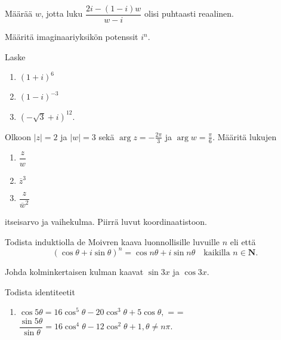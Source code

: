 \documentclass[a4paper, 12pt]{article}
\makeatletter
\theoremstyle{remark}
\theoremstyle{definition}
\renewcommand{\bar}[1]{\overline{#1}}
\newcommand{\abs}[1]{\lvert#1\rvert}
\newcommand{\inlineitem}[1][]{%
\ifnum\enit@type=\tw@
    {\descriptionlabel{#1}}
  \hspace{\labelsep}%
\else
  \ifnum\enit@type=\z@
       \refstepcounter{\@listctr}\fi
    \quad\@itemlabel\hspace{\labelsep}%
\fi}
\newenvironment{listaa} %
    {\begin{enumerate}[leftmargin=*, label=\alph*), topsep=0pt, itemsep=0pt, parsep=0pt, font=\small\bfseries\color{red}] \itemsep0pt \parskip0pt \parsep0pt \topsep0pt}
    {\end{enumerate}}
\makeatother
\begin{document}
\begin{teht}
Määrää $w$, jotta luku $\dfrac{2i-(1-i)w}{w-i}$ olisi puhtaasti reaalinen.
\end{teht}
\begin{teht} Määritä imaginaariyksikön potenssit $i^n.$
\end{teht}

\begin{teht} Laske
\begin{enumerate}[leftmargin=*, label=\roman*), topsep=0pt, itemsep=0pt, parsep=0pt, font=\small\bfseries\color{blue}]
\item $(1+i)^6$

\item $(1-i)^{-3}$

\item $(-\sqrt{3}+i)^{12}.$
\end{enumerate}

\end{teht}
\begin{teht} Olkoon $\abs{z}=2$ ja $\abs{w}=3$ sekä $\arg z=-\frac{2\pi}{3}$ ja $\arg w=\frac{\pi}{6}.$ Määritä lukujen
\begin{listaa}
\item $\dfrac{z}{w}$
\item $\bar{z}^3$
\item $\dfrac{z}{\bar{w}^2}$
\end{listaa} itseisarvo ja vaihekulma. Piirrä luvut koordinaatistoon.
\end{teht}

\begin{teht} Todista induktiolla de Moivren kaava luonnollisille luvuille $n$ eli että
$$
\left(\cos \theta+i\sin\theta\right)^n=\cos n\theta + i \sin n\theta\quad\text{kaikilla } n\in\mathbf{N}.
$$
\end{teht}

\begin{teht} Johda kolminkertaisen kulman kaavat $\sin 3x$ ja $\cos 3x.$
\end{teht}

\begin{teht} Todista identiteetit
\begin{enumerate}[label=\alph*), topsep=0pt, itemsep=0pt, parsep=0pt, leftmargin=*]
    \item $\cos 5\theta =16\cos^5 \theta -20\cos^3\theta +5\cos\theta,$
    \inlineitem $\dfrac{\sin 5\theta}{\sin\theta}=16\cos^4\theta -12\cos^2\theta+1, \theta\neq n\pi.$
\end{enumerate}
\end{teht}
\end{document}
